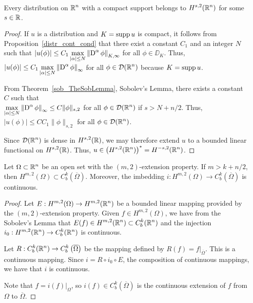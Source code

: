 \begin{cor} \label{sob_TheSobLemma_Cor1}
Every distribution on $\displaystyle \mathbb{R}^n$ with a compact support belongs to
$\displaystyle H^{s,2}(\mathbb{R}^n)$ for some $s\in \mathbb{R}$.
\end{cor}

\begin{proof}
If $u$ is a distribution and $K = \operatorname{supp} u$ is compact, it follows from
Proposition~\ref{distr_cont_cond} that there exist a constant $C_1$ and 
an integer $N$ such that
$\displaystyle \left| u(\phi) \right| \leq C_1 \max_{|\alpha|\leq N}
\left\| \operatorname{D}^\alpha \phi \right\|_{K,\infty}$ for all $\phi \in \DD_K$.
Thus,
$\displaystyle \left| u(\phi) \right| \leq C_1 \max_{|\alpha|\leq N}
\left\| \operatorname{D}^\alpha \phi \right\|_{\infty}$
for all $\displaystyle \phi \in \mathcal{D}(\mathbb{R}^n)$ because $K = \operatorname{supp} u$.

From Theorem~\ref{sob_TheSobLemma}, Sobolev's Lemma, there exists a
constant $C$ such that\\
$\displaystyle \max_{|\alpha|\leq N}
\left\| \operatorname{D}^\alpha \phi \right\|_{\infty} \leq C \|\phi\|_{s,2}$
for all $\displaystyle \phi \in \mathcal{D}(\mathbb{R}^n)$ if $s > N+ n/2$.  Thus,
$\displaystyle \left| u(\phi) \right| \leq C C_1 \|\phi\|_{s,2}$
for all $\displaystyle \phi \in \mathcal{D}(\mathbb{R}^n)$.

Since $\displaystyle \mathcal{D}(\mathbb{R}^n)$ is dense in
$\displaystyle H^{s,2}(\mathbb{R})$, we may
therefore extend $u$ to a bounded linear functional on
$\displaystyle H^{s,2}(\mathbb{R})$.  Thus,
$\displaystyle u \in \left( H^{s,2}(\mathbb{R}^n) \right)^\ast = H^{-s,2}(\mathbb{R}^n)$.
\end{proof}

\begin{cor} \label{sob_TheSobLemma_cor1}
Let $\displaystyle \Omega \subset \mathbb{R}^n$ be an open set with the
$(m,2)$-extension property. If $m>k +n/2$, then
$\displaystyle H^{m,2}(\Omega) \subset C_b^k(\overline{\Omega})$.
Moreover, the imbedding
$\displaystyle i:H^{m,2}(\Omega) \to C_b^k(\overline{\Omega})$
is continuous.
\end{cor}

\begin{proof}
Let $\displaystyle E:H^{m,2}(\Omega) \rightarrow H^{m,2}(\mathbb{R}^n)$ be a bounded
linear mapping provided by the $(m,2)$-extension property.  Given
$\displaystyle f\in H^{m,2}(\Omega)$, we have from the Sobolev's Lemma that
$\displaystyle E(f) \in H^{m,2}(\mathbb{R}^n) \subset C^k_b(\mathbb{R}^n)$ and the
injection $\displaystyle i_0:H^{m,2}(\mathbb{R}^n) \to C_b^k(\mathbb{R}^n)$ is
continuous.

Let $\displaystyle R: C_b^k(\mathbb{R}^n) \to C_b^k\left(\overline{\Omega}\right)$
be the mapping defined by $\displaystyle R(f) = f\big|_{\overline{\Omega}}$.
This is a continuous mapping.
Since $i = R\circ i_0 \circ E$, the composition of continuous mappings,
we have that $i$ is continuous.

Note that $\displaystyle f = i(f)\big|_{\Omega}$, so
$\displaystyle i(f) \in C^k_b(\overline{\Omega})$
is the continuous extension of $f$ from $\Omega$ to $\overline{\Omega}$.
\end{proof}

